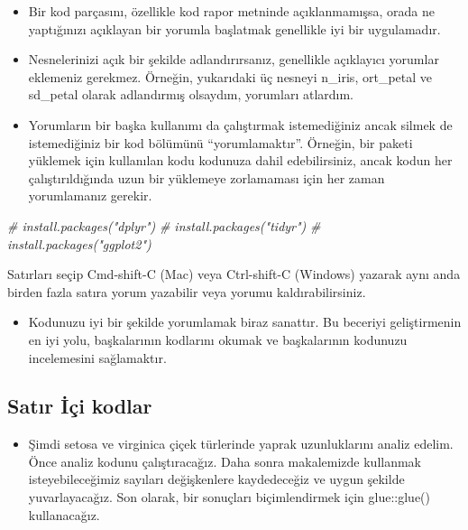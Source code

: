 \documentclass[
  oneside]{book}
\newenvironment{Shaded}{\begin{snugshade}}{\end{snugshade}}
\newcommand{\CommentTok}[1]{\textcolor[rgb]{0.56,0.35,0.01}{\textit{#1}}}
\providecommand{\tightlist}{%
  \setlength{\itemsep}{0pt}\setlength{\parskip}{0pt}}
\begin{document}
\begin{itemize}
\item
  Bir kod parçasını, özellikle kod rapor metninde açıklanmamışsa, orada ne yaptığınızı açıklayan bir yorumla başlatmak genellikle iyi bir uygulamadır.
\item
  Nesnelerinizi açık bir şekilde adlandırırsanız, genellikle açıklayıcı yorumlar eklemeniz gerekmez. Örneğin, yukarıdaki üç nesneyi n\_iris, ort\_petal ve sd\_petal olarak adlandırmış olsaydım, yorumları atlardım.
\item
  Yorumların bir başka kullanımı da çalıştırmak istemediğiniz ancak silmek de istemediğiniz bir kod bölümünü ``yorumlamaktır''. Örneğin, bir paketi yüklemek için kullanılan kodu kodunuza dahil edebilirsiniz, ancak kodun her çalıştırıldığında uzun bir yüklemeye zorlamaması için her zaman yorumlamanız gerekir.
\end{itemize}

\begin{Shaded}
\begin{Highlighting}[]
\CommentTok{\# install.packages("dplyr")}
\CommentTok{\# install.packages("tidyr")}
\CommentTok{\# install.packages("ggplot2")}
\end{Highlighting}
\end{Shaded}

\begin{info}
Satırları seçip Cmd-shift-C (Mac) veya Ctrl-shift-C (Windows) yazarak aynı anda birden fazla satıra yorum yazabilir veya yorumu kaldırabilirsiniz.

\end{info}

\begin{itemize}
\tightlist
\item
  Kodunuzu iyi bir şekilde yorumlamak biraz sanattır. Bu beceriyi geliştirmenin en iyi yolu, başkalarının kodlarını okumak ve başkalarının kodunuzu incelemesini sağlamaktır.
\end{itemize}

\hypertarget{inline-r}{%
\subsection{Satır İçi kodlar}\label{inline-r}}

\begin{itemize}
\tightlist
\item
  Şimdi setosa ve virginica çiçek türlerinde yaprak uzunluklarını analiz edelim. Önce analiz kodunu çalıştıracağız. Daha sonra makalemizde kullanmak isteyebileceğimiz sayıları değişkenlere kaydedeceğiz ve uygun şekilde yuvarlayacağız. Son olarak, bir sonuçları biçimlendirmek için glue::glue() kullanacağız.
\end{itemize}
\end{document}
